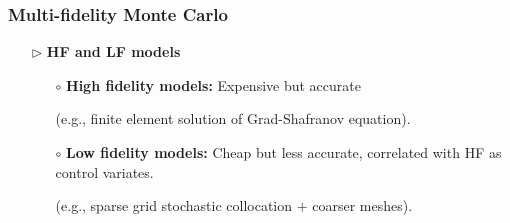 \documentclass{beamer}
\begin{document}
\begin{frame}[t]
    \frametitle{Multi-fidelity Monte Carlo}
\begin{itemize}[leftmargin=5pt] 
\item[$\triangleright$] \textcolor{myblue3}{\bf HF and LF models} 

{\footnotesize 
\begin{itemize}[leftmargin=5pt] 
     \item[$\circ$] {\bf High fidelity models:} Expensive but accurate 
     
     (e.g., finite element solution of Grad-Shafranov equation).
     \item[$\circ$] {\bf Low fidelity models:} Cheap but less accurate, correlated with HF as control variates.
     
     (e.g., sparse grid stochastic collocation $+$ coarser meshes).


\end{itemize}
 }

\end{itemize}
\end{frame}
\end{document}
